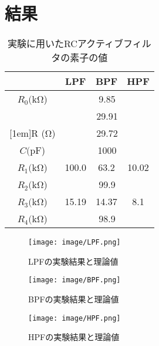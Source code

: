\documentclass[11pt,a4j]{jsarticle}
\makeatletter
\newcommand{\figcaption}[1]{\def\@captype{figure}\caption{#1}}
\makeatother
\begin{document}
\section{結果}

\begin{table}[H]
  \caption{実験に用いたRCアクティブフィルタの素子の値}
  \label{tab:rc}
  \begin{center}
      \begin{tabular}{|c|c|c|c|}
        \hline
         & LPF & BPF & HPF \\ \hline
        $ R_{0}  (\mathrm{k\Omega}$) & \multicolumn{3}{c|}{9.85} \\ \hline
         & \multicolumn{3}{c|}{29.91} \\ \cline{2-4}
        \raisebox{0.8em}[1em]{R  ($\mathrm{\Omega}$)} & \multicolumn{3}{c|}{29.72} \\ \hline
        $ C  (\mathrm{pF}$) & \multicolumn{3}{c|}{1000} \\ \hline
        $ R_{1}  (\mathrm{k\Omega}$) & 100.0 & 63.2 & 10.02 \\ \hline
        $ R_{2}  (\mathrm{k\Omega}$) & \multicolumn{3}{c|}{99.9} \\ \hline
        $ R_{3}  (\mathrm{k\Omega}$) & 15.19 & 14.37 & 8.1 \\ \hline
        $ R_{4}  (\mathrm{k\Omega}$) & \multicolumn{3}{c|}{98.9} \\ \hline

      \end{tabular}
  \end{center}
\end{table}



\begin{figure}[H]
  \centering
  \texttt{[image: image/LPF.png]}
  \figcaption{LPFの実験結果と理論値}
  \label{fig:lpf}
\end{figure}

\begin{figure}[H]
  \centering
  \texttt{[image: image/BPF.png]}
  \figcaption{BPFの実験結果と理論値}
  \label{fig:bpf}
\end{figure}

\begin{figure}[H]
  \centering
  \texttt{[image: image/HPF.png]}
  \figcaption{HPFの実験結果と理論値}
  \label{fig:hpf}
\end{figure}
\end{document}
